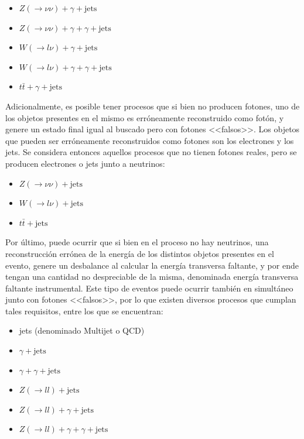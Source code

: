 \begin{itemize}
  \item $Z(\rightarrow \nu\nu) + \gamma + \text{jets}$
  \item $Z(\rightarrow \nu\nu) + \gamma + \gamma + \text{jets}$
  \item $W(\rightarrow l\nu) + \gamma + \text{jets}$
  \item $W(\rightarrow l\nu) + \gamma + \gamma + \text{jets}$
  \item $t\bar{t} + \gamma + \text{jets}$
\end{itemize}

Adicionalmente, es posible tener procesos que si bien no producen fotones, uno de los objetos presentes en el mismo es erróneamente reconstruido como fotón, y genere un estado final igual al buscado pero con fotones <<falsos>>. Los objetos que pueden ser erróneamente reconstruidos como fotones son los electrones y los jets. Se considera entonces aquellos procesos que no tienen fotones reales, pero se producen electrones o jets junto a neutrinos:

\begin{itemize}
  \item $Z(\rightarrow \nu\nu) + \text{jets}$
  \item $W(\rightarrow l\nu) + \text{jets}$
  \item $t\bar{t} + \text{jets}$
\end{itemize}

Por último, puede ocurrir que si bien en el proceso no hay neutrinos, una reconstrucción errónea de la energía de los distintos objetos presentes en el evento, genere un desbalance al calcular la energía transversa faltante, y por ende tengan una cantidad no despreciable de la misma, denominada energía transversa faltante instrumental. Este tipo de eventos puede ocurrir también en simultáneo junto con fotones <<falsos>>, por lo que existen diversos procesos que cumplan tales requisitos, entre los que se encuentran:

\begin{itemize}
  \item jets (denominado Multijet o QCD)
  \item $\gamma + \text{jets}$
  \item $\gamma + \gamma + \text{jets}$
  \item $Z(\rightarrow ll) + \text{jets}$
  \item $Z(\rightarrow ll) + \gamma + \text{jets}$
  \item $Z(\rightarrow ll) + \gamma + \gamma + \text{jets}$
\end{itemize}

